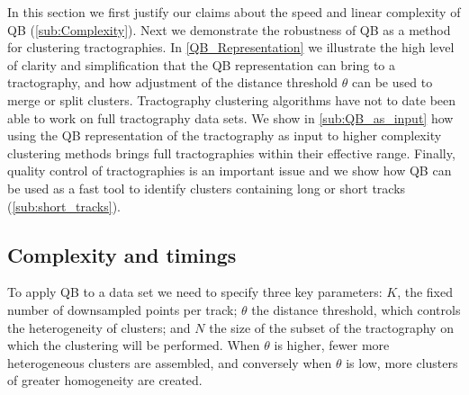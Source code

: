 \documentclass{bioinfo}
\begin{document}
In this section we first justify our claims about the speed and linear
complexity of QB (\ref{sub:Complexity}). Next we demonstrate the
robustness of QB as a method for clustering tractographies.  In
\ref{QB_Representation} we illustrate the high level of clarity and
simplification that the QB representation can bring to a tractography,
and how adjustment of the distance threshold $\theta$ can be used to
merge or split clusters. 
Tractography clustering algorithms have not to date been able to work on
full tractography data sets. We show in \ref{sub:QB_as_input} how using
the QB representation of the tractography as input to higher complexity
clustering methods brings full tractographies within their effective
range.
\noindent
Finally, quality control of
tractographies is an important issue and we show how QB can be used as a
fast tool to identify clusters containing long or short tracks
(\ref{sub:short_tracks}).

\subsection{Complexity and timings\label{sub:Complexity}}

To apply QB to a data set we need to specify three key parameters:
$K$, the fixed number of downsampled points per track; $\theta$
the distance threshold, which controls the heterogeneity of clusters;
and $N$ the size of the subset of the tractography on which the clustering
will be performed. When $\theta$ is higher, fewer more heterogeneous
clusters are assembled, and conversely when $\theta$ is low, more
clusters of greater homogeneity are created.
\end{document}
